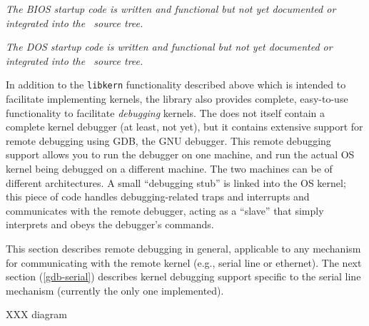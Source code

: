 \label{kern-x86pc-biosboot}

\emph{%
The BIOS startup code is written and functional
but not yet documented or integrated into the \oskit\ source tree.
}

\label{kern-x86pc-dosboot}

\emph{%
The DOS startup code is written and functional
but not yet documented or integrated into the \oskit\ source tree.
}

\label{gdb}

In addition to the {\tt libkern} functionality described above
which is intended to facilitate implementing kernels,
the library also provides complete, easy-to-use functionality
to facilitate \emph{debugging} kernels.
The \oskit{} does not itself contain a complete kernel debugger
(at least, not yet),
but it contains extensive support for remote debugging using GDB,
the GNU debugger.
This remote debugging support allows you to run the debugger on one machine,
and run the actual OS kernel being debugged on a different machine.
The two machines can be of different architectures.
A small ``debugging stub'' is linked into the OS kernel;
this piece of code handles debugging-related traps and interrupts
and communicates with the remote debugger,
acting as a ``slave'' that simply interprets and obeys the debugger's commands.

This section describes remote debugging in general,
applicable to any mechanism for communicating with the remote kernel
(e.g., serial line or ethernet).
The next section (\ref{gdb-serial}) describes kernel debugging support
specific to the serial line mechanism (currently the only one implemented).

XXX diagram

